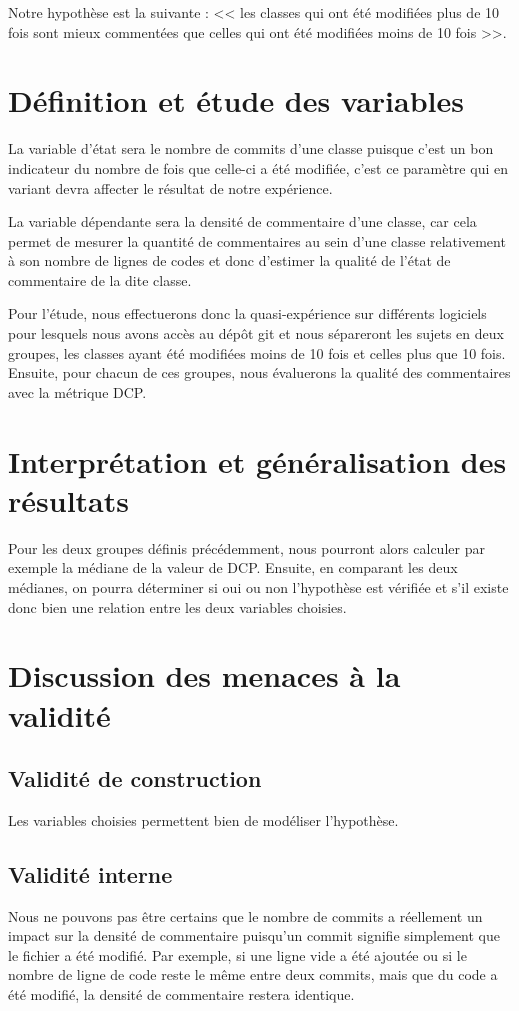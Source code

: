 \documentclass[11pt]{rapport-tp-qlm}
\begin{document}
Notre hypothèse est la suivante : << les classes qui ont été modifiées plus de 10 fois sont mieux commentées que celles qui ont été modifiées moins de 10 fois >>.


\section{Définition et étude des variables}


La variable d’état sera le nombre de commits d'une classe puisque c'est un bon indicateur du nombre de fois que celle-ci a été modifiée, c'est ce paramètre qui en variant devra affecter le résultat de notre expérience.


La variable dépendante sera la densité de commentaire d'une classe, car cela permet de mesurer la quantité de commentaires au sein d'une classe relativement à son nombre de lignes de codes et donc d'estimer la qualité de l'état de commentaire de la dite classe.




Pour l'étude, nous effectuerons donc la quasi-expérience sur différents logiciels pour lesquels nous avons accès au dépôt git et nous sépareront les sujets en deux groupes, les classes ayant été modifiées moins de 10 fois et celles plus que 10 fois. Ensuite, pour chacun de ces groupes, nous évaluerons la qualité des commentaires avec la métrique DCP.

\section{Interprétation et généralisation des résultats}
Pour les deux groupes définis précédemment, nous pourront alors calculer par exemple la médiane de la valeur de DCP. Ensuite, en comparant les deux médianes, on pourra déterminer si oui ou non l'hypothèse est vérifiée et s'il existe donc bien une relation entre les deux variables choisies.

\section{Discussion des menaces à la validité}
\subsection{Validité de construction}
Les variables choisies permettent bien de modéliser l'hypothèse.
\subsection{Validité interne}
Nous ne pouvons pas être certains que le nombre de commits a réellement un impact sur la densité de commentaire puisqu'un commit signifie simplement que le fichier a été modifié. Par exemple, si une ligne vide a été ajoutée ou si le nombre de ligne de code reste le même entre deux commits, mais que du code a été modifié, la densité de commentaire restera identique.
\end{document}
